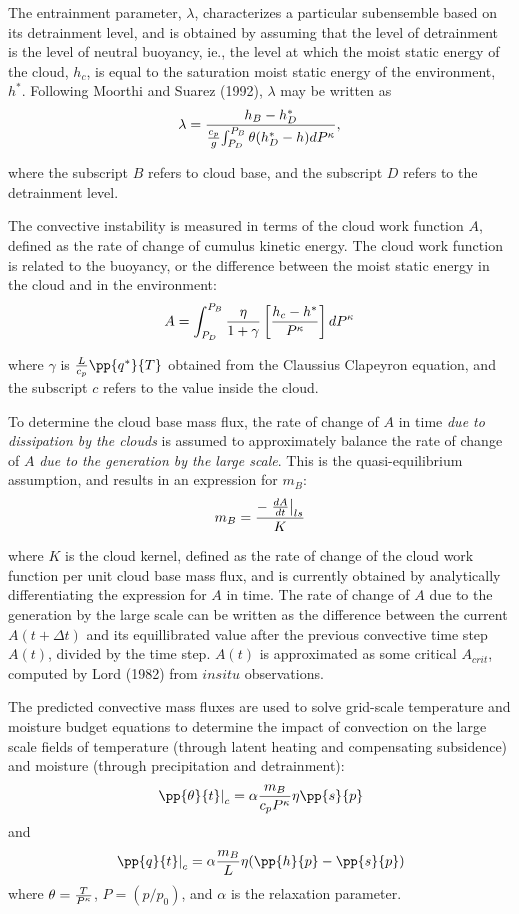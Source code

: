 The entrainment parameter, $\lambda$, characterizes a particular subensemble based on its
detrainment level, and is obtained by assuming that the level of detrainment is the level of neutral
buoyancy, ie., the level at which the moist static energy of the cloud, $h_c$, is equal 
to the saturation moist static energy of the environment, $h^*$.  Following Moorthi and Suarez (1992),
$\lambda$ may be written as
\[
\lambda = { {h_B - h^*_D} \over { {c_p \over g} {\int_{P_D}^{P_B}\theta(h^*_D-h)dP^{\kappa}}} } ,
\]

where the subscript $B$ refers to cloud base, and the subscript $D$ refers to the detrainment level.


The convective instability is measured in terms of the cloud work function $A$, defined as the
rate of change of cumulus kinetic energy. The cloud work function is 
related to the buoyancy, or the difference
between the moist static energy in the cloud and in the environment:
\[
A = \int_{P_D}^{P_B} { {\eta \over {1 + \gamma} } 
\left[ {{h_c-h^*} \over {P^{\kappa}}} \right] dP^{\kappa}}
\]

where $\gamma$ is ${L \over {c_p}}\pp{q^*}{T}$ obtained from the Claussius Clapeyron equation,
and the subscript $c$ refers to the value inside the cloud.


To determine the cloud base mass flux, the rate of change of $A$ in time {\em due to dissipation by 
the clouds} is assumed to approximately balance the rate of change of $A$ {\em due to the generation 
by the large scale}. This is the quasi-equilibrium assumption, and results in an expression for $m_B$:
\[
m_B = {{- \left.{dA \over dt} \right|_{ls}} \over K}
\]

where $K$ is the cloud kernel, defined as the rate of change of the cloud work function per
unit cloud base mass flux, and is currently obtained by analytically differentiating the 
expression for $A$ in time.
The rate of change of $A$ due to the generation by the large scale can be written as the
difference between the current $A(t+\Delta t)$ and its equillibrated value after the previous 
convective time step 
$A(t)$, divided by the time step. $A(t)$ is approximated as some critical $A_{crit}$,
computed by Lord (1982) from $in situ$ observations.


The predicted convective mass fluxes are used to solve grid-scale temperature
and moisture budget equations to determine the impact of convection on the large scale fields of
temperature (through latent heating and compensating subsidence) and moisture (through
precipitation and detrainment):
\[
\left.{\pp{\theta}{t}}\right|_{c} = \alpha { m_B \over {c_p P^{\kappa}}} \eta \pp{s}{p}
\]
and
\[
\left.{\pp{q}{t}}\right|_{c} = \alpha { m_B \over {L}} \eta (\pp{h}{p}-\pp{s}{p})
\]
where $\theta = {T \over P^{\kappa}}$, $P = (p/p_0)$, and $\alpha$ is the relaxation parameter.

